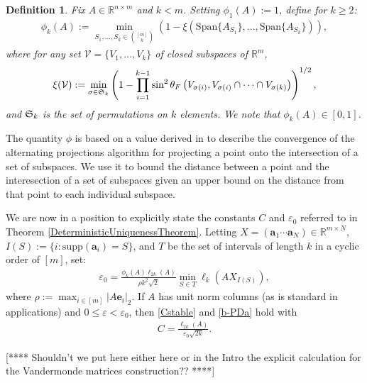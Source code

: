 \documentclass[journal, onecolumn]{IEEEtran}
\newtheorem{definition}{Definition}
\begin{document}
\begin{definition}\label{SpecialSupportSet}
Fix $A \in \mathbb{R}^{n \times m}$ and $k < m$. Setting $\phi_1(A) := 1$, define for $k \geq 2$:
\begin{align}\label{rho}
\phi_k(A) := \min_{ S_1,\ldots,S_k \in {[m] \choose k} } \left(1 - \xi( \text{Span}\{A_{S_1}\}, \ldots,  \text{Span}\{A_{S_k}\}) \right),
\end{align}
where for any set $\mathcal{V} = \{V_1, \ldots, V_k\}$ of closed subspaces of $\mathbb{R}^m$, 
\begin{align}
\xi(\mathcal{V}) := \min_{\sigma \in \frak{S}_k} \left(1 - \prod_{i=1}^{k-1} \sin^2  \theta_F \left(V_{\sigma(i)}, V_{\sigma(i)} \cap \cdots \cap V_{\sigma(k)}\right)  \right)^{1/2},
\end{align}
%
and $\frak{S}_k$ is the set of permutations on $k$ elements. We note that $\phi_k(A) \in [0,1]$.
\end{definition}

The quantity $\phi$ is based on a value derived in \cite{Deutsch} to describe the convergence of the alternating projections algorithm for projecting a point onto the intersection of a set of subspaces. We use it to bound the distance between a point and the interesection of a set of subspaces given an upper bound on the distance from that point to each individual subspace. 


We are now in a position to explicitly state the constants $C$ and $\varepsilon_0$ referred to in Theorem \ref{DeterministicUniquenessTheorem}. Letting $X  = (\mathbf{a}_1 \cdots \mathbf{a}_N) \in \mathbb{R}^{m \times N}$, $I(S) := \{i : \text{supp}(\mathbf{a}_i) = S\}$, and $T$ be the set of intervals of length $k$ in a cyclic order of $[m]$, set:
\begin{align}\label{epsilon0}
\varepsilon_0 = \frac{ \phi_k(A) \ell_{2k}(A) }{\rho k^2 \sqrt{2}} \min_{S \in T} \ell_k(AX_{I(S)}),
\end{align}
%
where $\rho := \max_{i \in [m]} |A\mathbf{e}_i|_2 $. If $A$ has unit norm columns (as is standard in applications) and $0 \leq \varepsilon < \varepsilon_0$, then \eqref{Cstable} and \eqref{b-PDa} hold with
\begin{align}\label{Cdef}
C = \frac{\ell_{2k}(A)}{ \varepsilon_0 \sqrt{2k}}.
\end{align}

[**** Shouldn't we put here either here or in the Intro the explicit calculation for the Vandermonde matrices construction?? ****]
\end{document}
